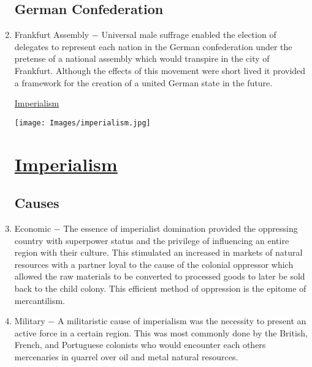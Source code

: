 \documentclass[12pt]{article}
\begin{document}
\begin{enumerate}
\subsection{German Confederation}


\item Frankfurt Assembly $-$ Universal male suffrage enabled the election of delegates to represent each nation in the German confederation under the pretense of a national assembly which would transpire in the city of Frankfurt. Although the effects of this movement were short lived it provided a framework for the creation of a united German state in the future.

\newpage
\begin{center}
\end{center}
\begin{center}
\end{center}
\begin{center}
\underline{\Huge Imperialism}
\end{center}
\vspace{0pt}
\begin{center}
\texttt{[image: Images/imperialism.jpg]}
\end{center}
\newpage

\section{\underline{Imperialism}}

\subsection{Causes}

\item Economic $-$ The essence of imperialist domination provided the oppressing country with superpower status and the privilege of influencing an entire region with their culture. This stimulated an increased in markets of natural resources with a partner loyal to the cause of the colonial oppressor which allowed the raw materials to be converted to processed goods to later be sold back to the child colony. This efficient method of oppression is the epitome of mercantilism.

\item Military $-$ A militaristic cause of imperialism was the necessity to present an active force in a certain region. This was most commonly done by the British, French, and Portuguese colonists who would encounter each others mercenaries in quarrel over oil and metal natural resources.


\end{enumerate}
\end{document}
